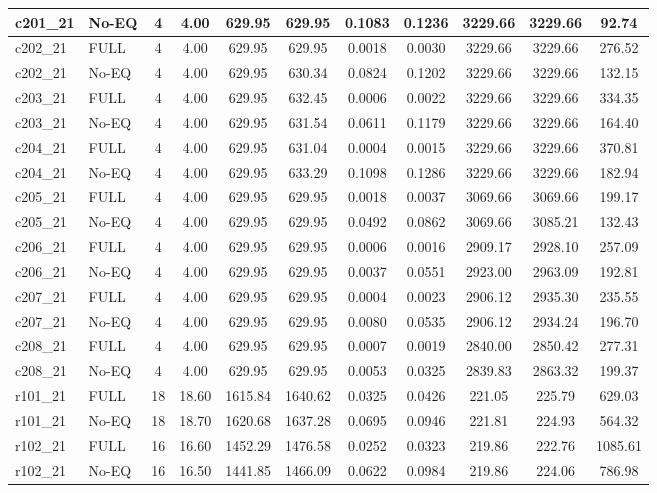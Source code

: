 \begin{longtable}{@{\extracolsep{\fill}}llccccccccc@{}}
c201\_21 & No-EQ & 4 & 4.00 & 629.95 & 629.95 & 0.1083 & 0.1236 & 3229.66 & 3229.66 & 92.74 \\
\midrule
c202\_21 & FULL & 4 & 4.00 & 629.95 & 629.95 & 0.0018 & 0.0030 & 3229.66 & 3229.66 & 276.52 \\
c202\_21 & No-EQ & 4 & 4.00 & 629.95 & 630.34 & 0.0824 & 0.1202 & 3229.66 & 3229.66 & 132.15 \\
\midrule
c203\_21 & FULL & 4 & 4.00 & 629.95 & 632.45 & 0.0006 & 0.0022 & 3229.66 & 3229.66 & 334.35 \\
c203\_21 & No-EQ & 4 & 4.00 & 629.95 & 631.54 & 0.0611 & 0.1179 & 3229.66 & 3229.66 & 164.40 \\
\midrule
c204\_21 & FULL & 4 & 4.00 & 629.95 & 631.04 & 0.0004 & 0.0015 & 3229.66 & 3229.66 & 370.81 \\
c204\_21 & No-EQ & 4 & 4.00 & 629.95 & 633.29 & 0.1098 & 0.1286 & 3229.66 & 3229.66 & 182.94 \\
\midrule
c205\_21 & FULL & 4 & 4.00 & 629.95 & 629.95 & 0.0018 & 0.0037 & 3069.66 & 3069.66 & 199.17 \\
c205\_21 & No-EQ & 4 & 4.00 & 629.95 & 629.95 & 0.0492 & 0.0862 & 3069.66 & 3085.21 & 132.43 \\
\midrule
c206\_21 & FULL & 4 & 4.00 & 629.95 & 629.95 & 0.0006 & 0.0016 & 2909.17 & 2928.10 & 257.09 \\
c206\_21 & No-EQ & 4 & 4.00 & 629.95 & 629.95 & 0.0037 & 0.0551 & 2923.00 & 2963.09 & 192.81 \\
\midrule
c207\_21 & FULL & 4 & 4.00 & 629.95 & 629.95 & 0.0004 & 0.0023 & 2906.12 & 2935.30 & 235.55 \\
c207\_21 & No-EQ & 4 & 4.00 & 629.95 & 629.95 & 0.0080 & 0.0535 & 2906.12 & 2934.24 & 196.70 \\
\midrule
c208\_21 & FULL & 4 & 4.00 & 629.95 & 629.95 & 0.0007 & 0.0019 & 2840.00 & 2850.42 & 277.31 \\
c208\_21 & No-EQ & 4 & 4.00 & 629.95 & 629.95 & 0.0053 & 0.0325 & 2839.83 & 2863.32 & 199.37 \\
\midrule
r101\_21 & FULL & 18 & 18.60 & 1615.84 & 1640.62 & 0.0325 & 0.0426 & 221.05 & 225.79 & 629.03 \\
r101\_21 & No-EQ & 18 & 18.70 & 1620.68 & 1637.28 & 0.0695 & 0.0946 & 221.81 & 224.93 & 564.32 \\
\midrule
r102\_21 & FULL & 16 & 16.60 & 1452.29 & 1476.58 & 0.0252 & 0.0323 & 219.86 & 222.76 & 1085.61 \\
r102\_21 & No-EQ & 16 & 16.50 & 1441.85 & 1466.09 & 0.0622 & 0.0984 & 219.86 & 224.06 & 786.98 \\

\end{longtable}
